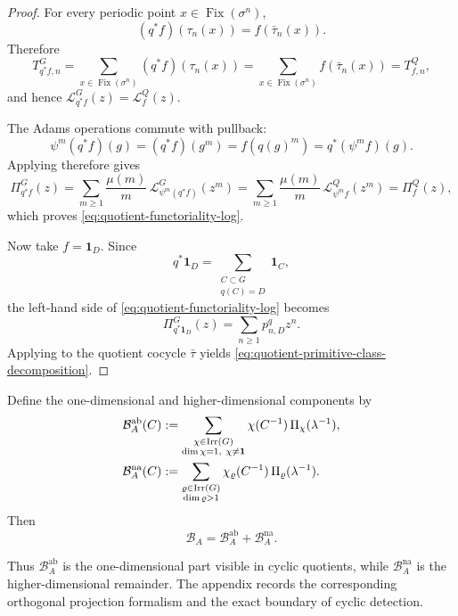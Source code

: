 \begin{proof}
  For every periodic point \(x\in\operatorname{Fix}(\sigma^n)\),
  \[
    (q^\ast f)(\tau_n(x))=f(\bar\tau_n(x)).
  \]
  Therefore
  \[
    T^{G}_{q^\ast f,n}
    =
    \sum_{x\in\operatorname{Fix}(\sigma^n)}(q^\ast f)(\tau_n(x))
    =
    \sum_{x\in\operatorname{Fix}(\sigma^n)}f(\bar\tau_n(x))
    =T^{Q}_{f,n},
  \]
  and hence \(\mathcal L_{q^\ast f}^{G}(z)=\mathcal L_f^{Q}(z)\).

  The Adams operations commute with pullback:
  \[
    \psi^m(q^\ast f)(g)
    =(q^\ast f)(g^m)
    =f(q(g)^m)
    =q^\ast(\psi^m f)(g).
  \]
  Applying  therefore gives
  \[
    \Pi_{q^\ast f}^{G}(z)
    =
    \sum_{m\ge 1}\frac{\mu(m)}{m}\,
      \mathcal L_{\psi^m(q^\ast f)}^{G}(z^m)
    =
    \sum_{m\ge 1}\frac{\mu(m)}{m}\,
      \mathcal L_{\psi^m f}^{Q}(z^m)
    =\Pi_f^{Q}(z),
  \]
  which proves \eqref{eq:quotient-functoriality-log}.

  Now take \(f=\mathbf 1_D\). Since
  \[
    q^\ast\mathbf 1_D=\sum_{\substack{C\subset G\\ q(C)=D}}\mathbf 1_C,
  \]
  the left-hand side of \eqref{eq:quotient-functoriality-log} becomes
  \[
    \Pi_{q^\ast\mathbf 1_D}^{G}(z)
    =
    \sum_{n\ge 1}p^q_{n,D}z^n.
  \]
  Applying  to the quotient
  cocycle \(\bar\tau\) yields
  \eqref{eq:quotient-primitive-class-decomposition}.
\end{proof}

Define the one-dimensional and higher-dimensional components by
\begin{equation}\label{eq:abelian-shadow-defect}
  \begin{aligned}
    \mathcal B_A^{\mathrm{ab}}(C)
    &:=
    \sum_{\substack{\chi\in\operatorname{Irr}(G)\\ \dim\chi=1,\ \chi\neq \mathbf 1}}
      \chi(C^{-1})\,\Pi_\chi(\lambda^{-1}), \\
    \mathcal B_A^{\mathrm{na}}(C)
    &:=
    \sum_{\substack{\varrho\in\operatorname{Irr}(G)\\ \dim\varrho>1}}
      \chi_\varrho(C^{-1})\,\Pi_\varrho(\lambda^{-1}).
  \end{aligned}
\end{equation}
Then
\begin{equation}\label{eq:abelian-shadow-defect-sum}
  \mathcal B_A=\mathcal B_A^{\mathrm{ab}}+\mathcal B_A^{\mathrm{na}}.
\end{equation}

Thus \(\mathcal B_A^{\mathrm{ab}}\) is the one-dimensional part visible
in cyclic quotients, while \(\mathcal B_A^{\mathrm{na}}\) is the
higher-dimensional remainder. The appendix records the corresponding
orthogonal projection formalism and the exact boundary of cyclic
detection.

